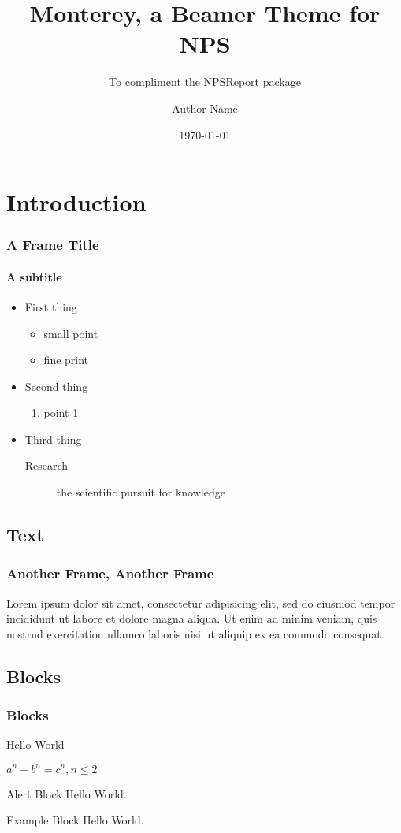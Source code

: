 \documentclass{beamer}
\title{Monterey, a Beamer Theme for NPS}
\subtitle{To compliment the NPSReport package}
\author{Author Name}
\date{\today}
\institute[\sc www.nps.edu]{Naval Postgraduate School}
\begin{document}
\begin{frame}[plain,t]
\titlepage
\end{frame}


\section{Introduction}
\begin{frame}
\frametitle{A Frame Title}
\framesubtitle{A subtitle}
\begin{itemize}
\item First thing
	\begin{itemize}
	\item small point
	\item fine print
	\end{itemize}
\item Second thing
	\begin{enumerate}
	\item point 1
	\end{enumerate}
\item Third thing
	\begin{description}
	\item[Research] the scientific pursuit for knowledge
	\end{description}
\end{itemize}
\end{frame}

\subsection{Text}
\begin{frame}
\frametitle{Another Frame, Another Frame}
Lorem ipsum dolor sit amet, consectetur adipisicing elit, sed do eiusmod tempor incididunt ut labore et dolore magna aliqua. Ut enim ad minim veniam, quis nostrud exercitation ullamco laboris nisi ut aliquip ex ea commodo consequat.
\end{frame}

\subsection{Blocks}
\begin{frame}
\frametitle{Blocks}
\begin{definition}[Greetings]
Hello World
\end{definition}

\begin{theorem}[Theorem]
$a^n + b^n = c^n, n \leq 2$
\end{theorem}

\begin{alertblock}{Alert Block}
Hello World.
\end{alertblock}

\begin{exampleblock}{Example Block}
Hello World.
\end{exampleblock}

\end{frame}



\end{document}
